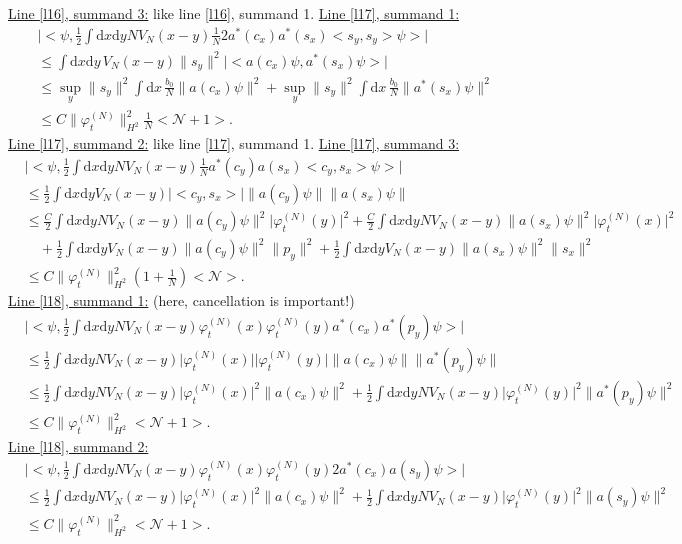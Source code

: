 \documentclass[11pt,a4paper,draft,DIV11]{scrartcl}	%
\newcommand{\di}{\textrm{d}}		%
\newcommand{\Ncal}{\mathcal{N}}		%
\newcommand{\estlist}[2]{\underline{Line \ref{l#1}, summand #2:}}
\newcommand{\nestlist}[2]{line \ref{l#1}, summand #2}
\newcommand{\Nestlist}[2]{Line \ref{l#1}, summand #2}
\newcommand{\scal}[2]{\big<#1,#2\big>} %
\newcommand{\norm}[1]{\lVert#1\rVert}	%
\newcommand{\ev}[1]{\big<#1\big>}	%
\newcommand{\ph}{\varphi_t^{(N)}}	%
\newcommand{\dxyNV}{\frac{1}{2}\int \di x\di y N V_N(x-y)} %
\newcommand{\dxyV}{\frac{1}{2}\int \di x\di y V_N(x-y)} %
\begin{document}
\underline{\Nestlist{16}{3}:} like \nestlist{16}{1}.\newline
\estlist{17}{1}
\begin{align*}
 & \lvert \scal{\psi}{\dxyNV \frac{1}{N}2 a^\ast(c_x)a^\ast(s_x) \scal{s_y}{s_y}\psi} \rvert \\
& \leq \int \di x\di y\, V_N(x-y) \norm{s_y}^2 \lvert \scal{a(c_x)\psi}{a^\ast(s_x)\psi}\rvert \\
& \leq \sup_y \norm{s_y}^2 \int \di x\, \frac{b_0}{N} \norm{a(c_x)\psi}^2 + \sup_y \norm{s_y}^2 \int \di x\, \frac{b_0}{N} \norm{a^\ast(s_x)\psi}^2 \\
& \leq C \norm{\ph}_{H^2}^2 \frac{1}{N}\ev{\Ncal+1}.
\end{align*}
\underline{\Nestlist{17}{2}:} like \nestlist{17}{1}.\newline
\estlist{17}{3}
\begin{align*}
& \lvert \scal{\psi}{\dxyNV \frac{1}{N} a^\ast(c_y) a(s_x) \scal{c_y}{s_x} \psi} \rvert \\
& \leq \dxyV \lvert \scal{c_y}{s_x} \rvert \norm{a(c_y)\psi} \norm{a(s_x)\psi} \\
& \leq \frac{C}{2}\int \di x\di y N V_N(x-y) \norm{a(c_y)\psi}^2 \lvert\ph(y)\rvert^2 + \frac{C}{2}\int \di x\di y N V_N(x-y) \norm{a(s_x)\psi}^2 \lvert \ph(x)\rvert^2 \\
& \quad + \dxyV \norm{a(c_y)\psi}^2 \norm{p_y}^2 + \dxyV \norm{a(s_x)\psi}^2 \norm{s_x}^2 \\
& \leq C \norm{\ph}_{H^2}^2 \left(1+\frac{1}{N}\right)\ev{\Ncal}.
\end{align*}
\estlist{18}{1} (here, cancellation is important!)
\begin{align*}
& \lvert \scal{\psi}{\dxyNV \ph(x)\ph(y) a^\ast(c_x) a^\ast(p_y)\psi} \rvert \\
& \leq \dxyNV \lvert\ph(x)\rvert \lvert\ph(y)\rvert \norm{a(c_x)\psi} \norm{a^\ast(p_y)\psi}\\
& \leq \dxyNV \lvert \ph(x)\rvert^2 \norm{a(c_x)\psi}^2 + \dxyNV \lvert\ph(y)\rvert^2 \norm{a^\ast(p_y)\psi}^2 \\
& \leq C\norm{\ph}_{H^2}^2 \ev{\Ncal+1}. 
\end{align*}
\estlist{18}{2} %
\begin{align*}
& \lvert \scal{\psi}{\dxyNV \ph(x)\ph(y) 2a^\ast(c_x)a(s_y)\psi} \rvert \\
& \leq \dxyNV \lvert\ph(x)\rvert^2 \norm{a(c_x)\psi}^2 + \dxyNV \lvert \ph(y)\rvert^2 \norm{a(s_y)\psi}^2 \\
& \leq C\norm{\ph}_{H^2}^2 \ev{\Ncal+1}.
\end{align*}
\end{document}
